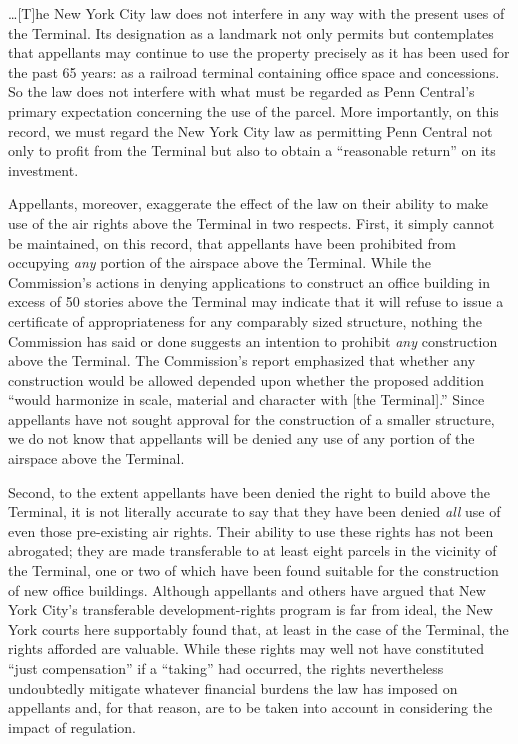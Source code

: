 \ldots [T]he New York City law does not interfere in any way with the present
uses of the Terminal. Its designation as a landmark not only permits but
contemplates that appellants may continue to use the property precisely as it
has been used for the past 65 years: as a railroad terminal containing office
space and concessions. So the law does not interfere with what must be regarded
as Penn Central's primary expectation concerning the use of the parcel. More
importantly, on this record, we must regard the New York City law as permitting
Penn Central not only to profit from the Terminal but also to obtain a
``reasonable return'' on its investment.

Appellants, moreover, exaggerate the effect of the law on their ability to make
use of the air rights above the Terminal in two respects. First, it simply
cannot be maintained, on this record, that appellants have been prohibited from
occupying \textit{any} portion of the airspace above the Terminal. While the
Commission's actions in denying applications to construct an office building in
excess of 50 stories above the Terminal may indicate that it will refuse to
issue a certificate of appropriateness for any comparably sized structure,
nothing the Commission has said or done suggests an intention to prohibit
\textit{any} construction above the Terminal. The Commission's report emphasized
that whether any construction would be allowed depended upon whether the
proposed addition ``would harmonize in scale, material and character with [the
Terminal].'' Since appellants have not sought approval for the construction of a
smaller structure, we do not know that appellants will be denied any use of any
portion of the airspace above the Terminal.

Second, to the extent appellants have been denied the right to build above the
Terminal, it is not literally accurate to say that they have been denied
\textit{all} use of even those pre-existing air rights. Their ability to use
these rights has not been abrogated; they are made transferable to at least
eight parcels in the vicinity of the Terminal, one or two of which have been
found suitable for the construction of new office buildings. Although appellants
and others have argued that New York City's transferable development-rights
program is far from ideal, the New York courts here supportably found that, at
least in the case of the Terminal, the rights afforded are valuable. While these
rights may well not have constituted ``just compensation'' if a ``taking'' had
occurred, the rights nevertheless undoubtedly mitigate whatever financial
burdens the law has imposed on appellants and, for that reason, are to be taken
into account in considering the impact of regulation. 

